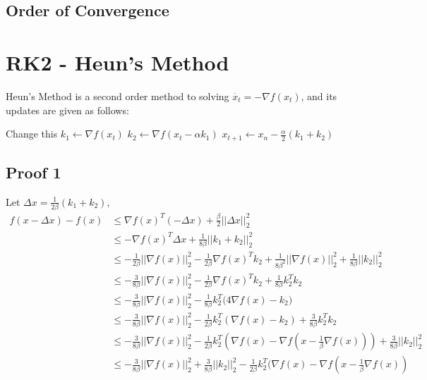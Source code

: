 \documentclass[12pt,twoside]{article}
\begin{document}
\subsection{Order of Convergence}
\section{RK2 - Heun's Method}
Heun's Method is a second order method to solving $\dot{x_t} = - \nabla f(x_t)$, and its updates are given as follows:

\begin{algorithmic}
\STATE Change this
  \STATE $k_1 \gets \nabla f(x_t)$
  \STATE $k_2 \gets \nabla f(x_t - \alpha k_1) $
  \STATE $x_{t+1} \gets x_n - \frac{\alpha}{2}(k_1 + k_2)$
\ENDFOR
\end{algorithmic}

\subsection{Proof 1}
Let $\Delta x = \frac{1}{2\beta}(k_1 + k_2) $,
\begin{equation}
\begin{aligned}
f(x - \Delta x) - f(x) &\leq \nabla f(x)^T ( - \Delta x) + \frac{\beta}{2}|| \Delta x||_2^2 \\
& \leq - \nabla f(x)^T \Delta x + \frac{1}{8 \beta}|| k_1 + k_2 ||_2^2 \\
& \leq -\frac{1}{2 \beta} || \nabla f(x) ||_2^2 - \frac{1}{2\beta}\nabla f(x)^T k_2 + \frac{1}{8 \beta^2}|| \nabla f(x) ||_2^2 + \frac{1}{8 \beta}|| k_2 ||_2^2 \\
&\leq -\frac{3}{8\beta}|| \nabla f(x) ||_2^2 - \frac{1}{2\beta}\nabla f(x)^Tk_2 + \frac{1}{8\beta}k_2^T k_2 \\
&\leq -\frac{3}{8\beta}|| \nabla f(x) ||_2^2 - \frac{1}{8\beta}k_2^T \big( 4\nabla f(x) - k_2 \big) \\
&\leq -\frac{3}{8\beta}|| \nabla f(x)||_2^2 - \frac{1}{2\beta}k_2^T(\nabla f(x) - k_2) + \frac{3}{8\beta}k_2^T k_2 \\
&\leq - \frac{3}{8\beta}|| \nabla f(x)||_2^2 - \frac{1}{2\beta}k_2^T(\nabla f(x) - \nabla f(x - \frac{1}{\beta}\nabla f(x))) + \frac{3}{8\beta}||k_2||_2^2 \\
&\leq -\frac{3}{8\beta}||\nabla f(x)||_2^2 + \frac{3}{8\beta}||k_2||_2^2 - \frac{1}{2\beta}k_2^T (\nabla f(x) - \nabla f(x - \frac{1}{\beta}\nabla f(x))
\end{aligned}
\end{equation}
\end{document}
